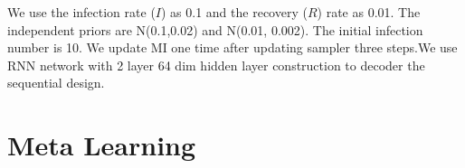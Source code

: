 \documentclass{article}
\theoremstyle{plain}
\theoremstyle{definition}
\theoremstyle{remark}
\newcommand{\Gv}{\bs{G}}
\newcommand{\FLO}{\texttt{FLO}}
\begin{document}
				
				We use the infection rate ($I$) as 0.1 and the recovery ($R$) rate as 0.01. The independent priors are N(0.1,0.02) and N(0.01, 0.002). The initial infection number is 10. We update MI one time after updating sampler three steps.We use RNN network with 2 layer 64 dim hidden layer construction to decoder the sequential design. 
				
				
				
				
				\section{Meta Learning}
				
\end{document}
